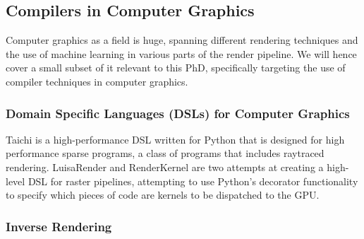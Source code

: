 \documentclass[review, acmsmall, nonacm]{acmart}
\begin{document}

\subsection{Compilers in Computer Graphics}

Computer graphics as a field is huge, spanning different rendering techniques and the use of machine learning in various parts of the render pipeline. We will hence cover a small subset of it relevant to this PhD, specifically targeting the use of compiler techniques in computer graphics. 

\subsubsection{Domain Specific Languages (DSLs) for Computer Graphics} Taichi \cite{huTaichiLanguageHighperformance2019} is a high-performance DSL written for Python that is designed for high performance sparse programs, a class of programs that includes raytraced rendering. LuisaRender \cite{zhengLuisaRenderHighPerformanceRendering2022} and RenderKernel \cite{yangRenderKernelHighlevelProgramming2024} are two attempts at creating a high-level DSL for raster pipelines, attempting to use Python's decorator functionality to specify which pieces of code are kernels to be dispatched to the GPU.

\subsubsection{Inverse Rendering}
\end{document}
